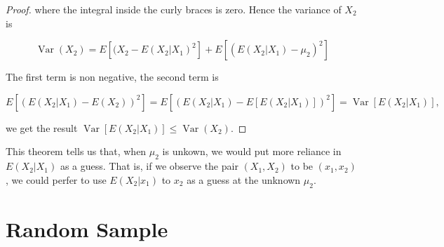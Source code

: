 \documentclass{article}
\begin{document}
\begin{proof}
                        where the integral inside the curly braces is zero. Hence the variance of $ X_{2} $ is

                        \begin{equation*}
                             \operatorname{Var}(X_{2}) = E \left[ (X_{2} -
                                 E(X_{2}|X_{1})^2 \right] + E \left[ (E(X_{2}|X_{1}) -
                         \mu_{2})^2 \right]
                        \end{equation*}

                        The first term is non negative, the second term is

                        \begin{equation*}
                            E\left[ (E(X_{2} | X_{1}) - E(X_{2}))^{2} \right] 
                                = E\left[ (E(X_{2} | X_{1}) - E[ E(X_{2} | X_{1}) ])^{2} \right]
                                = \operatorname{Var} \left[ E(X_{2} | X_{1}) \right],
                        \end{equation*}

                        we get the result $ \operatorname{Var}[E(X_{2}|X_{1})] \leq \operatorname{Var}(X_{2}) $.

                    \end{proof}

                    This theorem tells us that, when $ \mu_{2} $ is unkown, we would put more reliance in
                    $ E(X_{2} | X_{1}) $ as a guess. That is, if we observe the pair $ (X_{1}, X_{2}) $ to
                    be $ (x_{1}, x_{2}) $, we could perfer to use $ E(X_{2} | x_{1}) $ to $ x_{2} $ as a
                    guess at the unknown $ \mu_{2} $.

    \section{Random Sample}
\end{document}
